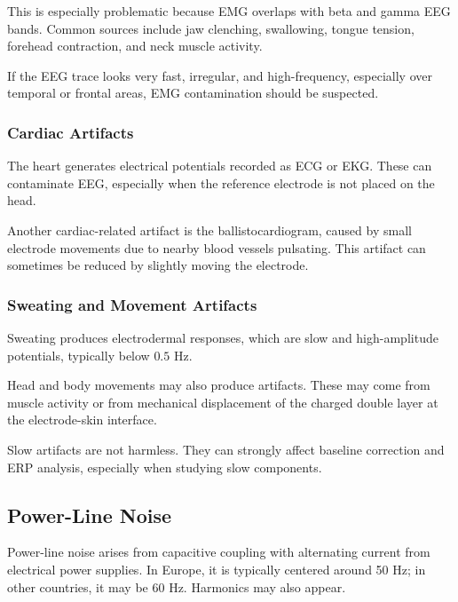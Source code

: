 This is especially problematic because EMG overlaps with beta and gamma EEG bands. Common sources include jaw clenching, swallowing, tongue tension, forehead contraction, and neck muscle activity.

\begin{authornote}
If the EEG trace looks very fast, irregular, and high-frequency, especially over temporal or frontal areas, EMG contamination should be suspected.
\end{authornote}

\subsubsection{Cardiac Artifacts}

The heart generates electrical potentials recorded as ECG or EKG. These can contaminate EEG, especially when the reference electrode is not placed on the head.

Another cardiac-related artifact is the ballistocardiogram, caused by small electrode movements due to nearby blood vessels pulsating. This artifact can sometimes be reduced by slightly moving the electrode.

\subsubsection{Sweating and Movement Artifacts}

Sweating produces electrodermal responses, which are slow and high-amplitude potentials, typically below $0.5$ Hz.

Head and body movements may also produce artifacts. These may come from muscle activity or from mechanical displacement of the charged double layer at the electrode-skin interface.

\begin{authornote}
Slow artifacts are not harmless. They can strongly affect baseline correction and ERP analysis, especially when studying slow components.
\end{authornote}

\subsection{Power-Line Noise}

Power-line noise arises from capacitive coupling with alternating current from electrical power supplies. In Europe, it is typically centered around 50 Hz; in other countries, it may be 60 Hz. Harmonics may also appear.

